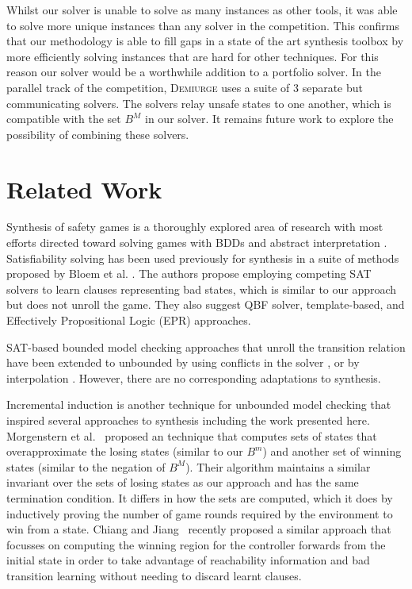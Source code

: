 \documentclass{llncs}
\begin{document}
Whilst our solver is unable to solve as many instances as other tools, it was
able to solve more unique instances than any solver in the competition. This
confirms that our methodology is able to fill gaps in a state of the art
synthesis toolbox by more efficiently solving instances that are hard for other
techniques. For this reason our solver would be a worthwhile addition to a
portfolio solver. In the parallel track of the competition, \textsc{Demiurge}
uses a suite of 3 separate but communicating solvers. The solvers
relay unsafe states to one another, which is compatible with the set $B^M$ in
our solver. It remains future work to explore the possibility of combining
these solvers.

\section{Related Work}

Synthesis of safety games is a thoroughly explored area of research with most
efforts directed toward solving games with BDDs \cite{burch1990} and abstract
interpretation \cite{walker2014,brenguier2014}. Satisfiability solving has been used
previously for synthesis in a suite of methods proposed by Bloem et al.
\cite{bloem2014}. The authors propose employing competing SAT solvers to learn
clauses representing bad states, which is similar to our approach but does not
unroll the game.  They also suggest QBF solver, template-based, and Effectively
Propositional Logic (EPR) approaches.

SAT-based bounded model checking approaches that unroll the transition relation
have been extended to unbounded by using conflicts in the solver
\cite{mcmillan2002}, or by interpolation \cite{mcmillan2003}. However, there
are no corresponding adaptations to synthesis.

Incremental induction \cite{bradley2011} is another technique for unbounded
model checking that inspired several approaches to synthesis including the work
presented here.  Morgenstern et al.~\cite{morgenstern2013} proposed an
technique that computes sets of states that overapproximate the losing states
(similar to our $B^m$) and another set of winning states (similar to the
negation of $B^M$).  Their algorithm maintains a similar invariant over the
sets of losing states as our approach and has the same termination condition.
It differs in how the sets are computed, which it does by inductively proving
the number of game rounds required by the environment to win from a state.
Chiang and Jiang~\cite{Chiang2015} recently proposed a similar approach that
focusses on computing the winning region for the controller forwards from the
initial state in order to take advantage of reachability information and bad
transition learning without needing to discard learnt clauses.
\end{document}
